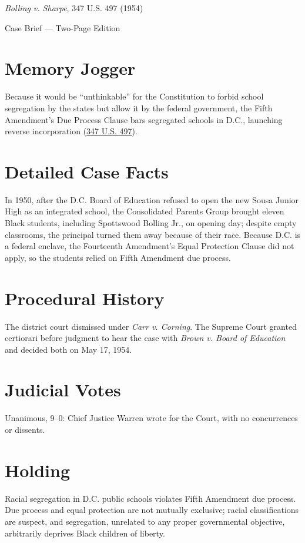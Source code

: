 \documentclass[12pt]{article}
\begin{document}
\begin{center}
{\LARGE \textit{Bolling v. Sharpe}, 347 U.S. 497 (1954)\par}
\vspace{0.5em}
{\large Case Brief --- Two-Page Edition\par}
\end{center}

\section{Memory Jogger}
Because it would be ``unthinkable'' for the Constitution to forbid school segregation by the states but allow it by the federal government, the Fifth Amendment's Due Process Clause bars segregated schools in D.C., launching reverse incorporation (\href{https://supreme.justia.com/cases/federal/us/347/497/}{347 U.S. 497}).

\section{Detailed Case Facts}
In 1950, after the D.C. Board of Education refused to open the new Sousa Junior High as an integrated school, the Consolidated Parents Group brought eleven Black students, including Spottswood Bolling Jr., on opening day; despite empty classrooms, the principal turned them away because of their race. Because D.C. is a federal enclave, the Fourteenth Amendment's Equal Protection Clause did not apply, so the students relied on Fifth Amendment due process.

\section{Procedural History}
The district court dismissed under \textit{Carr v. Corning}. The Supreme Court granted certiorari before judgment to hear the case with \textit{Brown v. Board of Education} and decided both on May 17, 1954.

\section{Judicial Votes}
Unanimous, 9--0: Chief Justice Warren wrote for the Court, with no concurrences or dissents.

\section{Holding}
Racial segregation in D.C. public schools violates Fifth Amendment due process. Due process and equal protection are not mutually exclusive; racial classifications are suspect, and segregation, unrelated to any proper governmental objective, arbitrarily deprives Black children of liberty.
\end{document}
